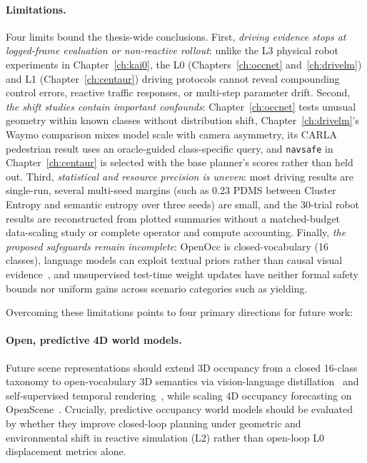 \paragraph{Limitations.}
Four limits bound the thesis-wide conclusions. First, \emph{driving evidence stops at logged-frame evaluation or non-reactive rollout}: unlike the L3 physical robot experiments in Chapter~\ref{ch:kai0}, the L0 (Chapters~\ref{ch:occnet} and~\ref{ch:drivelm}) and L1 (Chapter~\ref{ch:centaur}) driving protocols cannot reveal compounding control errors, reactive traffic responses, or multi-step parameter drift. Second, \emph{the shift studies contain important confounds}: Chapter~\ref{ch:occnet} tests unusual geometry within known classes without distribution shift, Chapter~\ref{ch:drivelm}'s Waymo comparison mixes model scale with camera asymmetry, its CARLA pedestrian result uses an oracle-guided class-specific query, and \texttt{navsafe} in Chapter~\ref{ch:centaur} is selected with the base planner's scores rather than held out. Third, \emph{statistical and resource precision is uneven}: most driving results are single-run, several multi-seed margins (such as 0.23 PDMS between Cluster Entropy and semantic entropy over three seeds) are small, and the 30-trial robot results are reconstructed from plotted summaries without a matched-budget data-scaling study or complete operator and compute accounting. Finally, \emph{the proposed safeguards remain incomplete}: OpenOcc is closed-vocabulary (16 classes), language models can exploit textual priors rather than causal visual evidence~\cite{xie2025vlms,liu2026perturbot}, and unsupervised test-time weight updates have neither formal safety bounds nor uniform gains across scenario categories such as yielding.

\medskip
\noindent Overcoming these limitations points to four primary directions for future work:

\paragraph{Open, predictive 4D world models.}
Future scene representations should extend 3D occupancy from a closed 16-class taxonomy to open-vocabulary 3D semantics via vision-language distillation~\cite{vobecky2023pop3d,jiang2025gausstr} and self-supervised temporal rendering~\cite{huang2024selfocc}, while scaling 4D occupancy forecasting on OpenScene~\cite{sima2023openscene,zheng2024occworld}. Crucially, predictive occupancy world models should be evaluated by whether they improve closed-loop planning under geometric and environmental shift in reactive simulation (L2) rather than open-loop L0 displacement metrics alone.

